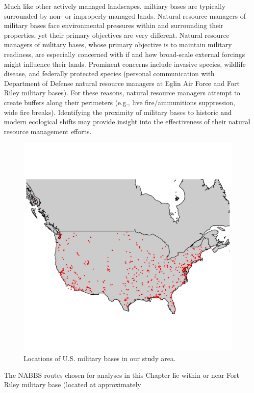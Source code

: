 \documentclass[12pt,twoside,openany]{reedthesis}
\begin{document}
Much like other actively managed landscapes, miltiary bases are
typically surrounded by non- or improperly-managed lands. Natural
resource managers of military bases face environmental pressures within
and surrounding their properties, yet their primary objectives are very
different. Natural resource managers of military bases, whose primary
objective is to maintain military readiness, are especially concerned
with if and how broad-scale external forcings might influence their
lands. Prominent concerns include invasive species, wildlife disease,
and federally protected species (personal communication with Department
of Defense natural resource managers at Eglin Air Force and Fort Riley
military bases). For these reasons, natural resource managers attempt to
create buffers along their perimeters (e.g., live fire/ammunitions
suppression, wide fire breaks). Identifying the proximity of military
bases to historic and modern ecological shifts may provide insight into
the effectiveness of their natural resource management efforts.
\begin{figure}

{\centering \includegraphics[width=0.85\linewidth]{./chapterFiles/fisherSpatial/figures/figsCalledInDiss/milBases} 

}

\caption{Locations of U.S. military bases in our study area.}\label{fig:milBases}
\end{figure}
The NABBS routes chosen for analyses in this Chapter lie within or near
Fort Riley military base (located at approximately
\end{document}
